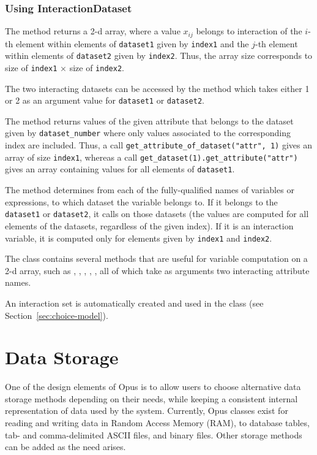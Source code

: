 {\subsubsection{Using InteractionDataset}
%
The method  \attributesindex returns a 2-d array, where a value
$x_{ij}$ belongs to interaction of the $i$-th element within elements of
\verb|dataset1| given by \verb|index1| and the $j$-th element within
elements of \verb|dataset2| given by \verb|index2|. Thus, the array size
corresponds to size of \verb|index1| $\times$ size of \verb|index2|.

The two interacting datasets \datasetindex can be accessed by the method
 which takes either 1 or 2 as an argument value for
\verb|dataset1| or \verb|dataset2|.

The method  returns values of
the given attribute \attributesindex that belongs to the dataset given by  \verb|dataset_number| where
only values associated to the corresponding index are included. Thus, a
call \verb|get_attribute_of_dataset("attr", 1)| \attributesindex gives an array of size
\verb|index1|, whereas a call \verb|get_dataset(1).get_attribute("attr")| \attributesindex
gives an array containing values for all elements of \verb|dataset1|.

The method  \variablesindex determines from each of the fully-qualified
names of variables or expressions, \variablesindex to which dataset the variable \variablesindex belongs to. If it belongs to
the \verb|dataset1| or \verb|dataset2|, it calls  \variablesindex on
those datasets (the values are computed for all elements of the datasets,
regardless of the given index). If it is an interaction variable, \variablesindex it is
computed only for elements given by \verb|index1| and \verb|index2|.

The  class contains several methods that are useful for
variable \variablesindex computation on a 2-d array, such as , ,
, , , all of which take 
as arguments two interacting attribute names.

An interaction set is automatically created and used in the
 class (see Section~\ref{sec:choice-model}).

\section{Data Storage}
\label{sec:data-storage}
%
One of the design elements of Opus is to allow users to choose alternative
data storage methods depending on their needs, while keeping a consistent
internal representation of data used by the system.  Currently, Opus classes
exist for reading and writing data in Random Access Memory (RAM), to database
tables, tab- and comma-delimited ASCII files, and binary files.  Other storage methods can
be added as the need arises.

}
